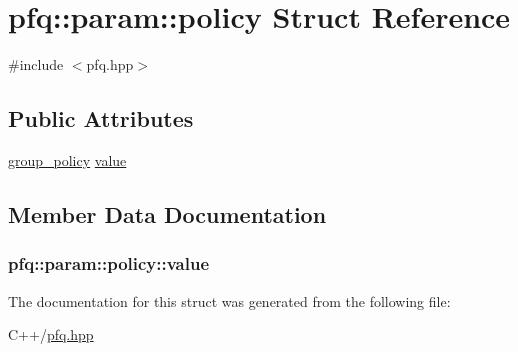 \hypertarget{structpfq_1_1param_1_1policy}{\section{pfq\+:\+:param\+:\+:policy Struct Reference}
\label{structpfq_1_1param_1_1policy}
}


{\ttfamily \#include $<$pfq.\+hpp$>$}

\subsection*{Public Attributes}
\begin{DoxyCompactItemize}
\item 
\hyperlink{namespacepfq_ac41249c8510558905b01fa4d866a38d7}{group\+\_\+policy} \hyperlink{structpfq_1_1param_1_1policy_ab0e84b461546b9e889dbe7b56ae39cdf}{value}
\end{DoxyCompactItemize}


\subsection{Member Data Documentation}
\hypertarget{structpfq_1_1param_1_1policy_ab0e84b461546b9e889dbe7b56ae39cdf}{
\subsubsection[{value}]{ pfq\+::param\+::policy\+::value}}\label{structpfq_1_1param_1_1policy_ab0e84b461546b9e889dbe7b56ae39cdf}


The documentation for this struct was generated from the following file\+:\begin{DoxyCompactItemize}
\item 
C++/\hyperlink{pfq_8hpp}{pfq.\+hpp}\end{DoxyCompactItemize}
